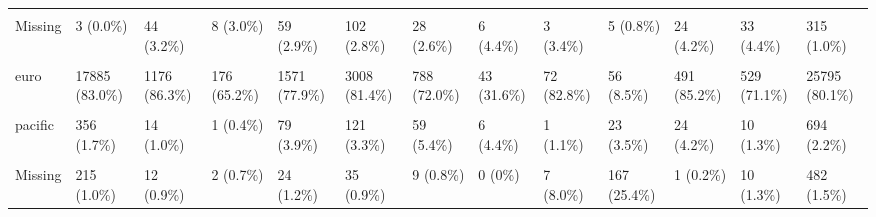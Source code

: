 \documentclass[
  single column]{article}
\begin{document}
\begin{landscape}
\begin{longtable}[t]{lllllllllllll}
\addlinespace
\cellcolor{gray!10}{Median [Min, Max]} & \cellcolor{gray!10}{1.00 [0, 1.00]} & \cellcolor{gray!10}{1.00 [0, 1.00]} & \cellcolor{gray!10}{1.00 [0, 1.00]} & \cellcolor{gray!10}{1.00 [0, 1.00]} & \cellcolor{gray!10}{1.00 [0, 1.00]} & \cellcolor{gray!10}{1.00 [0, 1.00]} & \cellcolor{gray!10}{1.00 [0, 1.00]} & \cellcolor{gray!10}{1.00 [0, 1.00]} & \cellcolor{gray!10}{1.00 [0, 1.00]} & \cellcolor{gray!10}{1.00 [0, 1.00]} & \cellcolor{gray!10}{1.00 [0, 1.00]} & \cellcolor{gray!10}{1.00 [0, \vphantom{1} 1.00]}\\
Missing & 3 (0.0\%) & 44 (3.2\%) & 8 (3.0\%) & 59 (2.9\%) & 102 (2.8\%) & 28 (2.6\%) & 6 (4.4\%) & 3 (3.4\%) & 5 (0.8\%) & 24 (4.2\%) & 33 (4.4\%) & 315 (1.0\%)\\
\cellcolor{gray!10}{eth\_cat} & \cellcolor{gray!10}{} & \cellcolor{gray!10}{} & \cellcolor{gray!10}{} & \cellcolor{gray!10}{} & \cellcolor{gray!10}{} & \cellcolor{gray!10}{} & \cellcolor{gray!10}{} & \cellcolor{gray!10}{} & \cellcolor{gray!10}{} & \cellcolor{gray!10}{} & \cellcolor{gray!10}{} & \cellcolor{gray!10}{}\\
euro & 17885 (83.0\%) & 1176 (86.3\%) & 176 (65.2\%) & 1571 (77.9\%) & 3008 (81.4\%) & 788 (72.0\%) & 43 (31.6\%) & 72 (82.8\%) & 56 (8.5\%) & 491 (85.2\%) & 529 (71.1\%) & 25795 (80.1\%)\\
\cellcolor{gray!10}{maori} & \cellcolor{gray!10}{2335 (10.8\%)} & \cellcolor{gray!10}{143 (10.5\%)} & \cellcolor{gray!10}{23 (8.5\%)} & \cellcolor{gray!10}{194 (9.6\%)} & \cellcolor{gray!10}{340 (9.2\%)} & \cellcolor{gray!10}{205 (18.7\%)} & \cellcolor{gray!10}{5 (3.7\%)} & \cellcolor{gray!10}{6 (6.9\%)} & \cellcolor{gray!10}{13 (2.0\%)} & \cellcolor{gray!10}{59 (10.2\%)} & \cellcolor{gray!10}{159 (21.4\%)} & \cellcolor{gray!10}{3482 (10.8\%)}\\
\addlinespace
pacific & 356 (1.7\%) & 14 (1.0\%) & 1 (0.4\%) & 79 (3.9\%) & 121 (3.3\%) & 59 (5.4\%) & 6 (4.4\%) & 1 (1.1\%) & 23 (3.5\%) & 24 (4.2\%) & 10 (1.3\%) & 694 (2.2\%)\\
\cellcolor{gray!10}{asian} & \cellcolor{gray!10}{760 (3.5\%)} & \cellcolor{gray!10}{18 (1.3\%)} & \cellcolor{gray!10}{68 (25.2\%)} & \cellcolor{gray!10}{149 (7.4\%)} & \cellcolor{gray!10}{192 (5.2\%)} & \cellcolor{gray!10}{34 (3.1\%)} & \cellcolor{gray!10}{82 (60.3\%)} & \cellcolor{gray!10}{1 (1.1\%)} & \cellcolor{gray!10}{399 (60.6\%)} & \cellcolor{gray!10}{1 (0.2\%)} & \cellcolor{gray!10}{36 (4.8\%)} & \cellcolor{gray!10}{1740 (5.4\%)}\\
Missing & 215 (1.0\%) & 12 (0.9\%) & 2 (0.7\%) & 24 (1.2\%) & 35 (0.9\%) & 9 (0.8\%) & 0 (0\%) & 7 (8.0\%) & 167 (25.4\%) & 1 (0.2\%) & 10 (1.3\%) & 482 (1.5\%)\\

\end{longtable}
\end{landscape}
\end{document}
